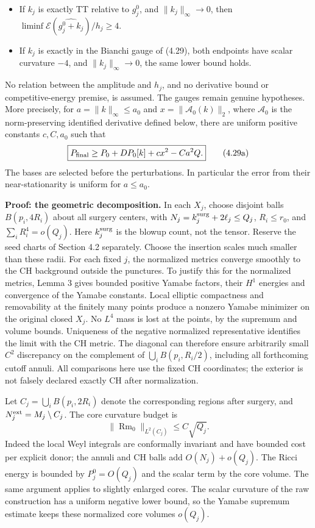 \documentclass[
  10pt,
]{article}
\providecommand{\tightlist}{%
  \setlength{\itemsep}{0pt}\setlength{\parskip}{0pt}}
\begin{document}
\begin{itemize}
\tightlist
\item
  If \(k_j\) is exactly TT relative to \(g_j^0\), and
  \(\|k_j\|_\infty\to0\), then
  \(\liminf\mathcal E(\widehat{g_j^0+k_j})/h_j\ge4\).
\item
  If \(k_j\) is exactly in the Bianchi gauge of (4.29), both endpoints
  have scalar curvature \(-4\), and \(\|k_j\|_\infty\to0\), the same
  lower bound holds.
\end{itemize}

No relation between the amplitude and \(h_j\), and no derivative bound
or competitive-energy premise, is assumed. The gauges remain genuine
hypotheses. More precisely, for \(a=\|k\|_\infty\le a_0\) and
\(x=\|\mathcal A_0(k)\|_2\), where \(\mathcal A_0\) is the
norm-preserving identified derivative defined below, there are uniform
positive constants \(c,C,a_0\) such that \[
 \boxed{P_{\rm final}\ge P_0+DP_0[k]+c x^2-Ca^2Q.} \tag{4.29a}
\] The bases are selected before the perturbations. In particular the
error from their near-stationarity is uniform for \(a\le a_0\).

\textbf{Proof: the geometric decomposition.} In each \(X_j\), choose
disjoint balls \(B(p_i,4R_i)\) about all surgery centers, with
\(N_j=k_j^{\rm surg}+2\ell_j\le Q_j\), \(R_i\le r_0\), and
\(\sum_i R_i^4=o(Q_j)\). Here \(k_j^{\rm surg}\) is the blowup count,
not the tensor. Reserve the seed charts of Section 4.2 separately.
Choose the insertion scales much smaller than these radii. For each
fixed \(j\), the normalized metrics converge smoothly to the CH
background outside the punctures. To justify this for the normalized
metrics, Lemma 3 gives bounded positive Yamabe factors, their \(H^1\)
energies and convergence of the Yamabe constants. Local elliptic
compactness and removability at the finitely many points produce a
nonzero Yamabe minimizer on the original closed \(X_j\). No \(L^4\) mass
is lost at the points, by the supremum and volume bounds. Uniqueness of
the negative normalized representative identifies the limit with the CH
metric. The diagonal can therefore ensure arbitrarily small \(C^2\)
discrepancy on the complement of \(\bigcup_i B(p_i,R_i/2)\), including
all forthcoming cutoff annuli. All comparisons here use the fixed CH
coordinates; the exterior is not falsely declared exactly CH after
normalization.

Let \(C_j=\bigcup_i B(p_i,2R_i)\) denote the corresponding regions after
surgery, and \(N_j^{\rm ext}=M_j\setminus C_j\). The core curvature
budget is \[
 \|\operatorname{Rm}_0\|_{L^2(C_j)}\le C\sqrt{Q_j}. \tag{4.30}
\] Indeed the local Weyl integrals are conformally invariant and have
bounded cost per explicit donor; the annuli and CH balls add
\(O(N_j)+o(Q_j)\). The Ricci energy is bounded by \(P_j^0=O(Q_j)\) and
the scalar term by the core volume. The same argument applies to
slightly enlarged cores. The scalar curvature of the raw construction
has a uniform negative lower bound, so the Yamabe supremum estimate
keeps these normalized core volumes \(o(Q_j)\).
\end{document}
